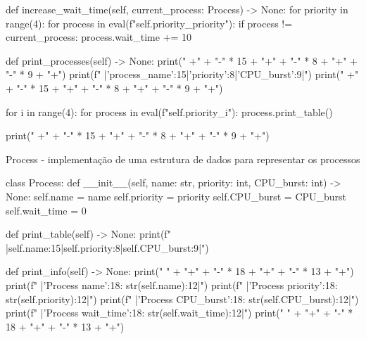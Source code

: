 \begin{pycode}
        
        def increase_wait_time(self, current_process: Process) -> None:
            for priority in range(4):
                for process in eval(f"self.priority_{priority}"):
                    if process != current_process:
                        process.wait_time += 10


        def print_processes(self) -> None:
            print("  +" + "-" * 15 + "+" + "-" * 8 + "+" + "-" * 9 + "+")
            print(f"  |{'process_name':15}|{'priority':8}|{'CPU_burst':9}|")
            print("  +" + "-" * 15 + "+" + "-" * 8 + "+" + "-" * 9 + "+")

            for i in range(4):
                for process in eval(f"self.priority_{i}"):
                    process.print_table()
            
            print("  +" + "-" * 15 + "+" + "-" * 8 + "+" + "-" * 9 + "+\n")
\end{pycode}

    Process - implementação de uma estrutura de dados para representar os processos
    \begin{pycode}
        class Process:
        def __init__(self, name: str, priority: int, CPU_burst: int) -> None:
            self.name = name
            self.priority = priority
            self.CPU_burst = CPU_burst
            self.wait_time = 0

        def print_table(self) -> None:
            print(f"  |{self.name:15}|{self.priority:8}|{self.CPU_burst:9}|")

        def print_info(self) -> None:
            print("  " + "+" + "-" * 18 + "+" + "-" * 13 + "+")
            print(f"  |{'Process name':18}: {str(self.name):12}|")
            print(f"  |{'Process priority':18}: {str(self.priority):12}|")
            print(f"  |{'Process CPU_burst':18}: {str(self.CPU_burst):12}|")
            print(f"  |{'Process wait_time':18}: {str(self.wait_time):12}|")
            print("  " + "+" + "-" * 18 + "+" + "-" * 13 + "+")
    \end{pycode}

